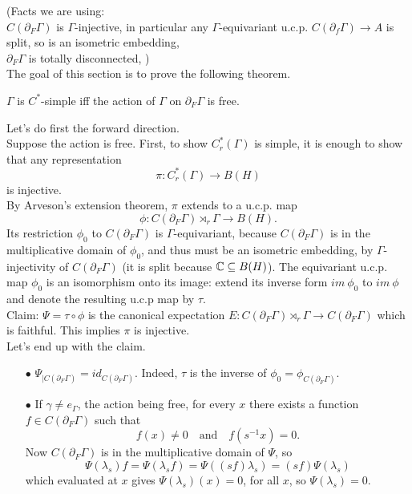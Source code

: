 (Facts we are using: \\ 
$C(\partial_F \Gamma)$ is $\Gamma$-injective, in particular any $\Gamma$-equivariant u.c.p. $C(\partial_f \Gamma)\rightarrow A$ is split, so is an isometric embedding,\\
$\partial_F \Gamma$ is totally disconnected, ) \\

The goal of this section is to prove the following theorem.

\begin{thm}
$\Gamma$ is $C^*$-simple iff the action of $\Gamma$ on $\partial_F \Gamma$ is free.
\end{thm}

Let's do first the forward direction.\\

Suppose the action is free. First, to show $C^*_r(\Gamma)$ is simple, it is enough to show that any representation 
\[\pi : C^*_r(\Gamma) \rightarrow B(H) \]
is injective. \\

By Arveson's extension theorem, $\pi$ extends to a u.c.p. map 
\[ \phi : C(\partial_F \Gamma)\rtimes_r \Gamma \rightarrow B(H). \]
Its restriction $\phi_0$ to $C(\partial_F \Gamma)$ is $\Gamma$-equivariant, because $C(\partial_F \Gamma)$ is in the multiplicative domain of $\phi_0$, and thus must be an isometric embedding, by $\Gamma$-injectivity of $C(\partial_F \Gamma)$ (it is split because $\mathbb C \subseteq B(H)$). The equivariant u.c.p. map $\phi_0$ is an isomorphism onto its image: extend its inverse form $im \  \phi_0$ to $im \ \phi$ and denote the resulting u.c.p map by $\tau$. \\

Claim: $\Psi = \tau \circ \phi $ is the canonical expectation $E : C(\partial_F \Gamma)\rtimes_r \Gamma \rightarrow C(\partial_F \Gamma)$ which is faithful. This implies $\pi$ is injective.\\

Let's end up with the claim. 
\begin{itemize}
\item[$\bullet$] $\Psi_{|C(\partial_F \Gamma)} = id_{C(\partial_F \Gamma)}$. Indeed, $\tau$ is the inverse of $\phi_0 = \phi_{C(\partial_F \Gamma)}$.
\item[$\bullet$] If $\gamma\neq e_\Gamma$, the action being free, for every $x$ there exists a function $f\in C(\partial_F \Gamma)$ such that 
\[f(x)\neq 0 \quad \text{and} \quad f(s^{-1}x) =0.\]
Now $C(\partial_F \Gamma)$ is in the multiplicative domain of $\Psi$, so
\[ \Psi(\lambda_s) f = \Psi( \lambda_s f) = \Psi( (sf)\lambda_s ) = (sf) \Psi( \lambda_s ) \]
which evaluated at $x$ gives $\Psi(\lambda_s)(x) = 0$, for all $x$, so $\Psi(\lambda_s)=0$. \\ 
\end{itemize}


